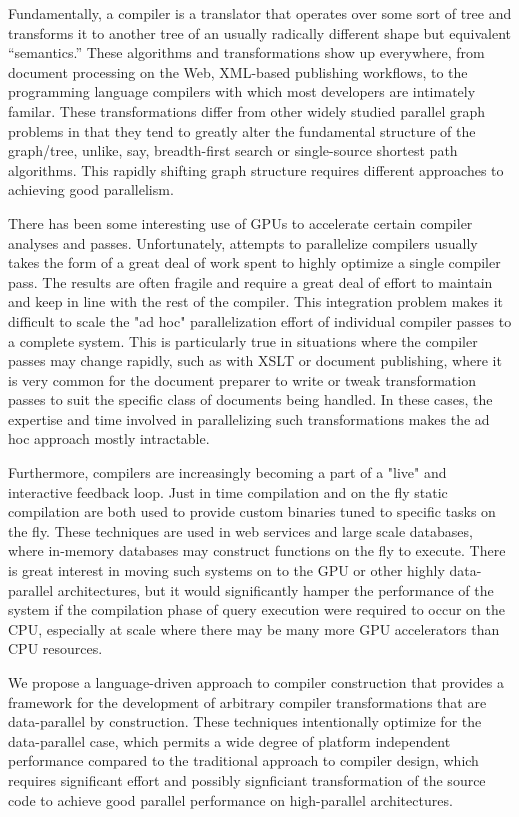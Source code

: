 \documentclass[numbers,preprint]{sigplanconf}
\begin{document}
Fundamentally, a compiler is a translator that operates over some sort
of tree and transforms it to another tree of an usually radically
different shape but equivalent ``semantics.'' These algorithms and
transformations show up everywhere, from document processing on the
Web, XML-based publishing workflows, to the programming language
compilers with which most developers are intimately familar.
These transformations differ from other widely studied parallel
graph problems in that they tend to greatly alter the fundamental
structure of the graph/tree, unlike, say, breadth-first search or
single-source shortest path algorithms. This rapidly shifting graph
structure requires different approaches to achieving good parallelism.

There has been some interesting use of GPUs to accelerate certain
compiler analyses and passes.  Unfortunately, attempts to parallelize
compilers usually takes the form of a great deal of work spent
to highly optimize a single compiler pass. The results are often
fragile and require a great deal of effort to maintain and keep in
line with the rest of the compiler. This integration problem makes it
difficult to scale the "ad hoc" parallelization effort of individual
compiler passes to a complete system. This is particularly true in
situations where the compiler passes may change rapidly, such as with
XSLT or document publishing, where it is very common for the document
preparer to write or tweak transformation passes to suit the specific
class of documents being handled. In these cases, the expertise and
time involved in parallelizing such transformations makes the ad hoc
approach mostly intractable.

Furthermore, compilers are increasingly becoming a part of a "live"
and interactive feedback loop.  Just in time compilation and on
the fly static compilation are both used to provide custom binaries
tuned to specific tasks on the fly. These techniques are used in web
services and large scale databases, where in-memory databases may
construct functions on the fly to execute. There is great interest
in moving such systems on to the GPU or other highly data-parallel
architectures, but it would significantly hamper the performance of
the system if the compilation phase of query execution were required
to occur on the CPU, especially at scale where there may be many more
GPU accelerators than CPU resources.

We propose a language-driven approach to compiler construction that
provides a framework for the development of arbitrary compiler
transformations that are data-parallel by construction. These
techniques intentionally optimize for the data-parallel case, which
permits a wide degree of platform independent performance compared to
the traditional approach to compiler design, which requires significant
effort and possibly signficiant transformation of the source code to
achieve good parallel performance on high-parallel architectures.
\end{document}
